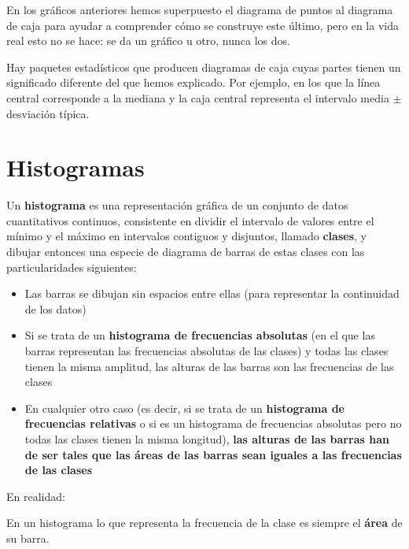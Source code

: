 \documentclass[
]{book}
\theoremstyle{definition}
\theoremstyle{definition}
\theoremstyle{definition}
\theoremstyle{definition}
\theoremstyle{remark}
\begin{document}
\begin{rmdcaution}
En los gráficos anteriores hemos superpuesto el diagrama de puntos al diagrama de caja para ayudar a comprender cómo se construye este último, pero en la vida real esto no se hace: se da un gráfico u otro, nunca los dos.
\end{rmdcaution}

\begin{rmdcaution}
Hay paquetes estadísticos que producen diagramas de caja cuyas partes tienen un significado diferente del que hemos explicado. Por ejemplo, en los que la línea central corresponde a la mediana y la caja central representa el intervalo media \(\pm\) desviación típica.
\end{rmdcaution}

\hypertarget{histogramas}{%
\section{Histogramas}\label{histogramas}}

Un \textbf{histograma} es una representación gráfica de un conjunto de datos cuantitativos continuos, consistente en dividir el intervalo de valores entre el mínimo y el máximo en intervalos contiguos y disjuntos, llamado \textbf{clases}, y dibujar entonces una especie de diagrama de barras de estas clases con las particularidades siguientes:

\begin{itemize}
\item
  Las barras se dibujan sin espacios entre ellas (para representar la continuidad de los datos)
\item
  Si se trata de un \textbf{histograma de frecuencias absolutas} (en el que las barras representan las frecuencias absolutas de las clases) y todas las clases tienen la misma amplitud, las alturas de las barras son las frecuencias de las clases
\item
  En cualquier otro caso (es decir, si se trata de un \textbf{histograma de frecuencias relativas} o si es un histograma de frecuencias absolutas pero no todas las clases tienen la misma longitud), \textbf{las alturas de las barras han de ser tales que las áreas de las barras sean iguales a las frecuencias de las clases}
\end{itemize}

En realidad:

\begin{rmdimportant}
En un histograma lo que representa la frecuencia de la clase es siempre el \textbf{área} de su barra.
\end{rmdimportant}
\end{document}
